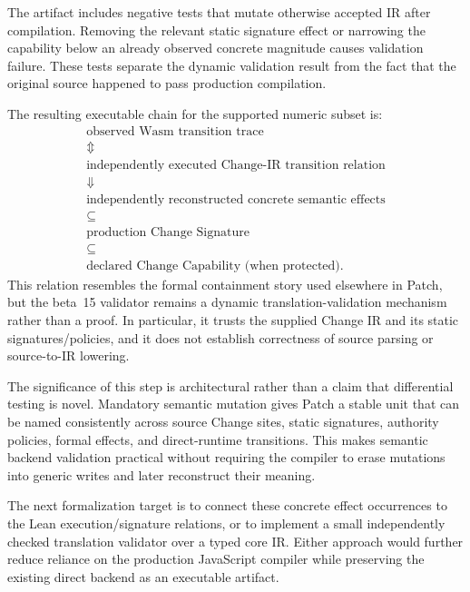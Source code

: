 The artifact includes negative tests that mutate otherwise accepted IR after compilation. Removing the relevant static signature effect or narrowing the capability below an already observed concrete magnitude causes validation failure. These tests separate the dynamic validation result from the fact that the original source happened to pass production compilation.

The resulting executable chain for the supported numeric subset is:
\[
\begin{array}{c}
\text{observed Wasm transition trace}\\
\Updownarrow\\
\text{independently executed Change-IR transition relation}\\
\Downarrow\\
\text{independently reconstructed concrete semantic effects}\\
\subseteq\\
\text{production Change Signature}\\
\subseteq\\
\text{declared Change Capability (when protected).}
\end{array}
\]
This relation resembles the formal containment story used elsewhere in Patch, but the beta~15 validator remains a dynamic translation-validation mechanism rather than a proof. In particular, it trusts the supplied Change IR and its static signatures/policies, and it does not establish correctness of source parsing or source-to-IR lowering.

The significance of this step is architectural rather than a claim that differential testing is novel. Mandatory semantic mutation gives Patch a stable unit that can be named consistently across source Change sites, static signatures, authority policies, formal effects, and direct-runtime transitions. This makes semantic backend validation practical without requiring the compiler to erase mutations into generic writes and later reconstruct their meaning.

The next formalization target is to connect these concrete effect occurrences to the Lean execution/signature relations, or to implement a small independently checked translation validator over a typed core IR. Either approach would further reduce reliance on the production JavaScript compiler while preserving the existing direct backend as an executable artifact.
